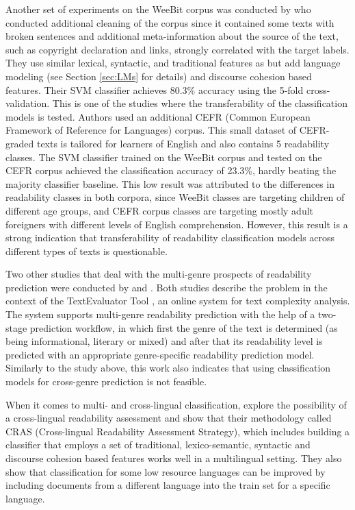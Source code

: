 \documentclass{clv3}
\begin{document}
Another set of experiments on the WeeBit corpus was conducted by \citet{xia2016text} who conducted additional cleaning of the corpus since it contained some texts with broken sentences and additional meta-information about the source of the text, such as copyright declaration and links, strongly correlated with the target labels. They use similar lexical, syntactic, and traditional features as \citet{vajjala2012improving} but add language modeling (see Section \ref{sec:LMs} for details) and discourse cohesion based features. Their SVM classifier achieves 80.3\% accuracy using the 5-fold cross-validation. This is one of the studies where the transferability of the classification models is tested. Authors used an additional CEFR (Common European Framework of Reference for Languages) corpus. This small dataset of CEFR-graded texts is tailored for learners of English \citep{council2001common} and also contains 5 readability classes. The SVM classifier trained on the WeeBit corpus and tested on the CEFR corpus achieved the classification accuracy of 23.3\%, hardly beating the majority classifier baseline. This low result was attributed to the differences in readability classes in both corpora, since WeeBit classes are targeting children of different age groups, and CEFR corpus classes are targeting mostly adult foreigners with different levels of English comprehension. However, this result is a strong indication that transferability of readability classification models across different types of texts is questionable.

Two other studies that deal with the multi-genre prospects of readability prediction were conducted by \citet{sheehan2013two} and \citet{napolitano2015online}. Both studies describe the problem in the context of the TextEvaluator Tool \citep{sheehan2010generating}, an online system for text complexity analysis. The system supports multi-genre readability prediction with the help of a two-stage prediction workflow, in which first the genre of the text is determined (as being informational, literary or mixed) and after that its readability level is predicted with an appropriate genre-specific readability prediction model. Similarly to the study above, this work also indicates that using classification models for cross-genre prediction is not feasible. 

When it comes to multi- and cross-lingual classification,  \citet{madrazo2020cross} explore the possibility of a cross-lingual readability assessment and show that their methodology called CRAS (Cross-lingual Readability Assessment Strategy), which includes building a classifier that employs a set of traditional, lexico-semantic, syntactic and discourse cohesion based features works well in a multilingual setting. They also show that classification for some low resource languages can be improved by including documents from a different language into the train set for a specific language. 
\end{document}
